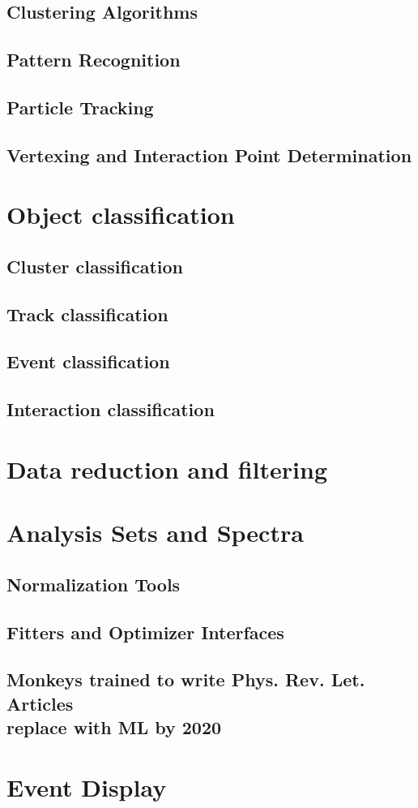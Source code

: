 \subsection{Clustering Algorithms}
\subsection{Pattern Recognition}
\subsection{Particle Tracking}
\subsection{Vertexing and Interaction Point Determination}

\section{Object classification}
\subsection{Cluster classification}
\subsection{Track classification}
\subsection{Event classification}
\subsection{Interaction classification}

\section{Data reduction and filtering}

\section{Analysis Sets and Spectra}
\subsection{Normalization Tools}
\subsection{Fitters and Optimizer Interfaces}
\subsection{Monkeys trained to write Phys. Rev. Let. Articles\\ replace with ML by 2020}

\section{Event Display}  %
